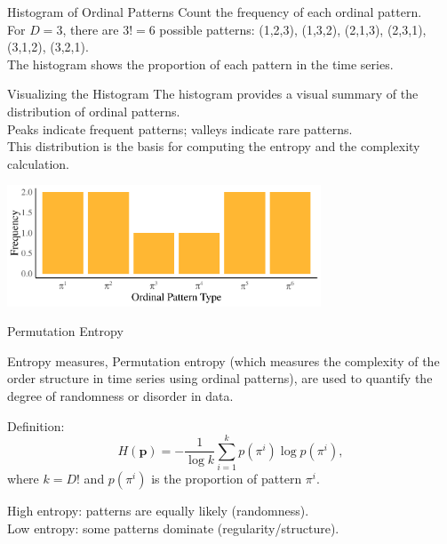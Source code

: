 \documentclass{beamer}
\begin{document}
\begin{frame}{Histogram of Ordinal Patterns}
	Count the frequency of each ordinal pattern.\\
	For $D=3$, there are $3!=6$ possible patterns: (1,2,3), (1,3,2), (2,1,3), (2,3,1), (3,1,2), (3,2,1).\\
	The histogram shows the proportion of each pattern in the time series.
\end{frame}

\begin{frame}{Visualizing the Histogram}
	The histogram provides a visual summary of the distribution of ordinal patterns.\\
	Peaks indicate frequent 
	patterns; valleys indicate rare patterns.\\
	This distribution is the basis for computing the entropy and the complexity 
	calculation.
		\begin{center}
		\includegraphics[width=0.7\textwidth]{frequency histogram}
	\end{center}
\end{frame}


\begin{frame}{Permutation Entropy}


	Entropy measures, %
	\alert{Permutation entropy} (which measures the complexity of the order structure in time series using ordinal patterns), are used to quantify the degree of randomness or disorder in data. 
	\begin{block}{Definition:}
		\[
		H(\mathbf{p}) = -\dfrac{1}{\log k} \sum_{i=1}^{k} p(\pi^i) \log p(\pi^i),
		\]
		where $k=D!$ and $p(\pi^i)$ is the proportion of pattern $\pi^i$.
	\end{block}
	High entropy: patterns are equally likely (randomness).\\
	Low entropy: some patterns dominate (regularity/structure).
\end{frame}
\end{document}
